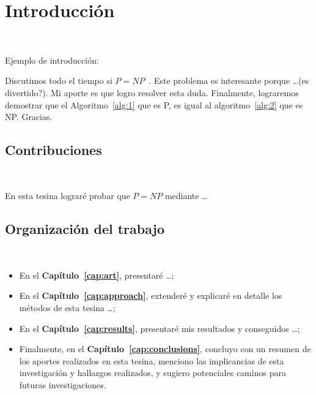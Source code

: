 \chapter{Introducción}
~\label{cap:intro}

Ejemplo de introducción:

Discutimos todo el tiempo si $P = NP$~\cite{p-np}. Este problema es interesante
porque \ldots (es divertido?). Mi aporte es que logro resolver esta duda.
Finalmente, lograremos demostrar que el Algoritmo~\ref{alg:1} que es P, es
igual al algoritmo~\ref{alg:2} que es NP\@. Gracias.

\section{Contribuciones}
~\label{cap:intro:sec:contributions}

En esta tesina lograré probar que $P = NP$ mediante \ldots

\section{Organización del trabajo}
~\label{cap:intro:sec:outline}

\begin{itemize}
	\item En el \textbf{Capítulo~\ref{cap:art}}, presentaré \ldots ;

	\item En el \textbf{Capítulo~\ref{cap:approach}}, extenderé y explicaré en detalle
	      los métodos de esta tesina \ldots ;

	\item En el \textbf{Capítulo~\ref{cap:results}}, presentaré mis resultados y
	      conseguidos \ldots;

	\item Finalmente, en el \textbf{Capítulo~\ref{cap:conclusions}}, concluyo con un
	      resumen de los aportes realizados en esta tesina, menciono las implicancias de
	      esta investigación y hallazgos realizados, y sugiero potenciales caminos para
	      futuras investigaciones. %

\end{itemize}

